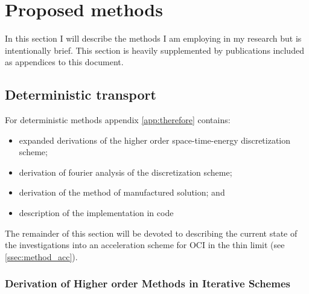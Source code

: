 \chapter{Proposed methods}
\label{ch:methods}

In this section I will describe the methods I am employing in my research but is intentionally brief.
This section is heavily supplemented by publications included as appendices to this document.

\section{Deterministic transport}

For deterministic methods appendix \ref{app:therefore} contains:
\begin{itemize}
    \item expanded derivations of the higher order space-time-energy discretization scheme;
    \item derivation of fourier analysis of the discretization scheme;
    \item derivation of the method of manufactured solution; and
    \item description of the implementation in code 
\end{itemize}
The remainder of this section will be devoted to describing the current state of the investigations into an acceleration scheme for OCI in the thin limit (see \ref{ssec:method_acc}).

\subsection{Derivation of Higher order Methods in Iterative Schemes}

